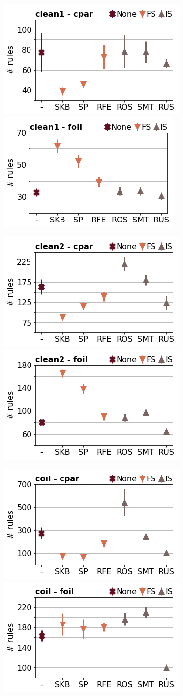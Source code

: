 \documentclass[runningheads,a4paper]{llncs}
\begin{document}
\begin{figure}[!h]

\includegraphics[width=0.32\linewidth]{fig/preps_clean1_RB_cpar_nbr_rules.png}
\includegraphics[width=0.32\linewidth]{fig/preps_clean1_RB_foil_nbr_rules.png}
\end{figure}


\begin{figure}[!h]
\includegraphics[width=0.32\linewidth]{fig/preps_clean2_RB_cpar_nbr_rules.png}
\includegraphics[width=0.32\linewidth]{fig/preps_clean2_RB_foil_nbr_rules.png}
\end{figure}


\begin{figure}[!h]
\includegraphics[width=0.32\linewidth]{fig/preps_coil2000_RB_cpar_nbr_rules.png}
\includegraphics[width=0.32\linewidth]{fig/preps_coil2000_RB_foil_nbr_rules.png}
\end{figure}
\end{document}

